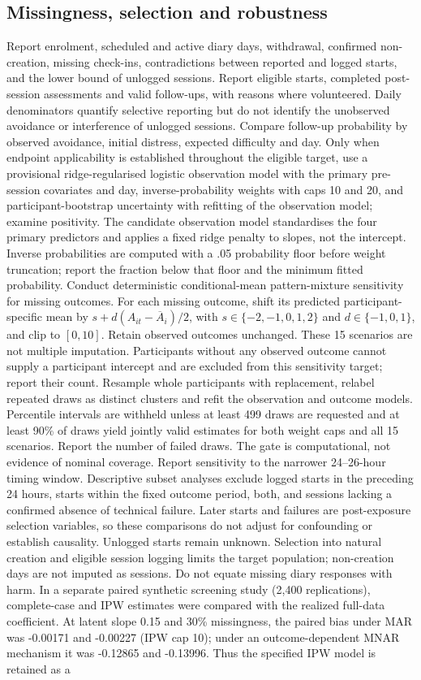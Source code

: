 \documentclass[11pt]{article}
\begin{document}
\subsection{Missingness, selection and robustness}
Report enrolment, scheduled and active diary days, withdrawal, confirmed non-creation, missing check-ins, contradictions between reported and logged starts, and the lower bound of unlogged sessions. Report eligible starts, completed post-session assessments and valid follow-ups, with reasons where volunteered. Daily denominators quantify selective reporting but do not identify the unobserved avoidance or interference of unlogged sessions. Compare follow-up probability by observed avoidance, initial distress, expected difficulty and day. Only when endpoint applicability is established throughout the eligible target, use a provisional ridge-regularised logistic observation model with the primary pre-session covariates and day, inverse-probability weights with caps 10 and 20, and participant-bootstrap uncertainty with refitting of the observation model; examine positivity. The candidate observation model standardises the four primary predictors and applies a fixed ridge penalty to slopes, not the intercept. Inverse probabilities are computed with a .05 probability floor before weight truncation; report the fraction below that floor and the minimum fitted probability. Conduct deterministic conditional-mean pattern-mixture sensitivity for missing outcomes. For each missing outcome, shift its predicted participant-specific mean by $s+d(A_{it}-\overline A_i)/2$, with $s\in\{-2,-1,0,1,2\}$ and $d\in\{-1,0,1\}$, and clip to $[0,10]$. Retain observed outcomes unchanged. These 15 scenarios are not multiple imputation. Participants without any observed outcome cannot supply a participant intercept and are excluded from this sensitivity target; report their count. Resample whole participants with replacement, relabel repeated draws as distinct clusters and refit the observation and outcome models. Percentile intervals are withheld unless at least 499 draws are requested and at least 90\% of draws yield jointly valid estimates for both weight caps and all 15 scenarios. Report the number of failed draws. The gate is computational, not evidence of nominal coverage. Report sensitivity to the narrower 24--26-hour timing window. Descriptive subset analyses exclude logged starts in the preceding 24 hours, starts within the fixed outcome period, both, and sessions lacking a confirmed absence of technical failure. Later starts and failures are post-exposure selection variables, so these comparisons do not adjust for confounding or establish causality. Unlogged starts remain unknown. Selection into natural creation and eligible session logging limits the target population; non-creation days are not imputed as sessions. Do not equate missing diary responses with harm. In a separate paired synthetic screening study (2,400 replications), complete-case and IPW estimates were compared with the realized full-data coefficient. At latent slope 0.15 and 30\% missingness, the paired bias under MAR was -0.00171 and -0.00227 (IPW cap 10); under an outcome-dependent MNAR mechanism it was -0.12865 and -0.13996. Thus the specified IPW model is retained as a 
\end{document}
